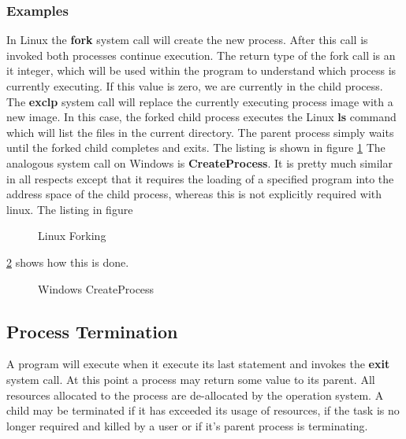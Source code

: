 \documentclass[10pt,a4paper]{article}
\begin{document}
\subsubsection{Examples}
In Linux the {\bf fork} system call will create the new process. After this call is invoked both processes continue execution. The return type of the fork call is an it integer, which will be used within the program to understand which process is currently executing. If this value is zero, we are currently in the child process. The {\bf exclp} system call will replace the currently executing process image with a new image. In this case, the forked child process executes the Linux {\bf ls} command which will list the files in the current directory. The parent process simply waits until the forked child completes and exits. The listing is shown in figure \ref{linuxfork}
\newline\newline
The analogous system call on Windows is {\bf CreateProcess}. It is pretty much similar in all respects except that it requires the loading of a specified program into the address space of the child process, whereas this is not explicitly required with linux. The listing in figure 
\begin{figure}
\caption{Linux Forking \cite{OSCONCEPTS}}
\begin{center}

\label{linuxfork}
\end{center}
\end{figure}
\ref{windowscreateprocess} shows how this is done.  
\begin{figure}
\caption{Windows CreateProcess\cite{OSCONCEPTS}}
\begin{center}

\label{windowscreateprocess}
\end{center}
\end{figure}
\subsection{Process Termination}
A program will execute when it execute its last statement and invokes the {\bf exit} system call. At this point a process may return some value to its parent. All resources allocated to the process are de-allocated by the operation system. A child may be terminated if it has exceeded its usage of resources, if the task is no longer required and killed by a user or if it's parent process is terminating. 
\end{document}
